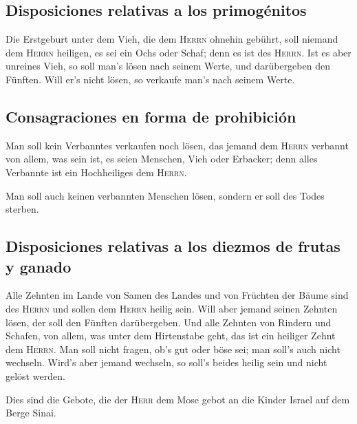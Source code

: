 \hypertarget{disposiciones-relativas-a-los-primoguxe9nitos}{%
\subsection{Disposiciones relativas a los
primogénitos}\label{disposiciones-relativas-a-los-primoguxe9nitos}}

 Die Erstgeburt unter dem Vieh, die dem \textsc{Herrn}
ohnehin gebührt, soll niemand dem \textsc{Herrn} heiligen, es sei ein
Ochs oder Schaf; denn es ist des \textsc{Herrn}.  Ist es
aber unreines Vieh, so soll man's lösen nach seinem Werte, und
darübergeben den Fünften. Will er's nicht lösen, so verkaufe man's nach
seinem Werte.

\hypertarget{consagraciones-en-forma-de-prohibiciuxf3n}{%
\subsection{Consagraciones en forma de
prohibición}\label{consagraciones-en-forma-de-prohibiciuxf3n}}

 Man soll kein Verbanntes verkaufen noch lösen, das
jemand dem \textsc{Herrn} verbannt von allem, was sein ist, es seien
Menschen, Vieh oder Erbacker; denn alles Verbannte ist ein Hochheiliges
dem \textsc{Herrn}.

 Man soll auch keinen verbannten Menschen lösen, sondern
er soll des Todes sterben.

\hypertarget{disposiciones-relativas-a-los-diezmos-de-frutas-y-ganado}{%
\subsection{Disposiciones relativas a los diezmos de frutas y
ganado}\label{disposiciones-relativas-a-los-diezmos-de-frutas-y-ganado}}

 Alle Zehnten im Lande von Samen des Landes und von
Früchten der Bäume sind des \textsc{Herrn} und sollen dem \textsc{Herrn}
heilig sein.  Will aber jemand seinen Zehnten lösen, der
soll den Fünften darübergeben.  Und alle Zehnten von
Rindern und Schafen, von allem, was unter dem Hirtenstabe geht, das ist
ein heiliger Zehnt dem \textsc{Herrn}.  Man soll nicht
fragen, ob's gut oder böse sei; man soll's auch nicht wechseln. Wird's
aber jemand wechseln, so soll's beides heilig sein und nicht gelöst
werden.

 Dies sind die Gebote, die der \textsc{Herr} dem Mose
gebot an die Kinder Israel auf dem Berge Sinai.
